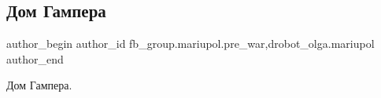  
 
 
 
 

\subsection{Дом Гампера}
\label{sec:15_02_2023.fb.fb_group.mariupol.pre_war.3.dom_gampera}
 
\ifcmt
 author_begin
   author_id fb_group.mariupol.pre_war,drobot_olga.mariupol
 author_end
\fi

Дом Гампера.

